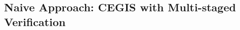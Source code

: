 \documentclass[runningheads,a4paper]{llncs}
\begin{document}

\subsection{Naive Approach: CEGIS with Multi-staged Verification}
\label{sec:CEGIS-precision-incrementation}
\end{document}
